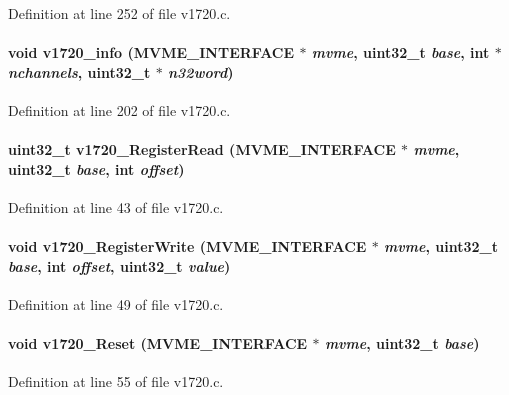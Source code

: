 Definition at line 252 of file v1720.c.
\paragraph[{v1720\_\-info}]{\setlength{\rightskip}{0pt plus 5cm}void v1720\_\-info ({\bf MVME\_\-INTERFACE} $\ast$ {\em mvme}, \/  uint32\_\-t {\em base}, \/  int $\ast$ {\em nchannels}, \/  uint32\_\-t $\ast$ {\em n32word})}\hfill\label{v1720_8c_a6fef2659a864d29134fbf7fcf004e5b2}


Definition at line 202 of file v1720.c.
\paragraph[{v1720\_\-RegisterRead}]{\setlength{\rightskip}{0pt plus 5cm}uint32\_\-t v1720\_\-RegisterRead ({\bf MVME\_\-INTERFACE} $\ast$ {\em mvme}, \/  uint32\_\-t {\em base}, \/  int {\em offset})}\hfill\label{v1720_8c_a982011febfc8669a1661a55221097e62}


Definition at line 43 of file v1720.c.
\paragraph[{v1720\_\-RegisterWrite}]{\setlength{\rightskip}{0pt plus 5cm}void v1720\_\-RegisterWrite ({\bf MVME\_\-INTERFACE} $\ast$ {\em mvme}, \/  uint32\_\-t {\em base}, \/  int {\em offset}, \/  uint32\_\-t {\em value})}\hfill\label{v1720_8c_a5012e18a8742d8175b95a354ba4cae21}


Definition at line 49 of file v1720.c.
\paragraph[{v1720\_\-Reset}]{\setlength{\rightskip}{0pt plus 5cm}void v1720\_\-Reset ({\bf MVME\_\-INTERFACE} $\ast$ {\em mvme}, \/  uint32\_\-t {\em base})}\hfill\label{v1720_8c_a9c8bde659a10c005af8dc217731c11c8}


Definition at line 55 of file v1720.c.

